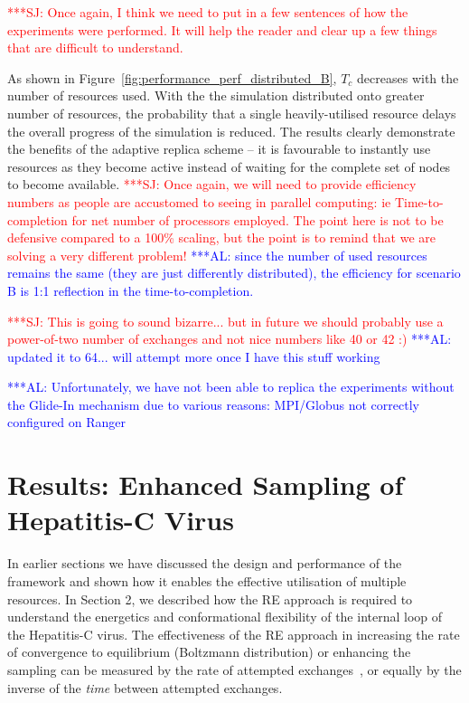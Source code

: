 \documentclass{rspublic}
\newcommand{\alnote}[1]{ {\textcolor{blue} { ***AL: #1 }}}
\newcommand{\jhanote}[1]{ {\textcolor{red} { ***SJ: #1 }}}
\newcommand{\alnote}[1]{}
\newcommand{\jhanote}[1]{}
\begin{document}
\jhanote{Once again, I think we need to put in a few sentences of how
  the experiments were performed. It will help the reader and clear up
  a few things that are difficult to understand.}

As shown in Figure~\ref{fig:performance_perf_distributed_B}, $T_{c}$
decreases with the number of resources used.  With the the simulation
distributed onto greater number of resources, the probability that a
single heavily-utilised resource delays the overall progress of the
simulation is reduced.
The results clearly demonstrate the benefits of the adaptive replica
scheme -- it is favourable to instantly use resources as they become
active instead of waiting for the complete set of nodes to become
available.  \jhanote{Once again, we will need to provide efficiency
  numbers as people are accustomed to seeing in parallel computing: ie
  Time-to-completion for net number of processors employed.  The point
  here is not to be defensive compared to a 100\% scaling, but the
  point is to remind that we are solving a very different problem!}
\alnote{since the number of used resources remains the same (they are
  just differently distributed), the efficiency for scenario B is 1:1
  reflection in the time-to-completion.}


\jhanote{This is going to sound bizarre... but in future we should
  probably use a power-of-two number of exchanges and not nice numbers
  like 40 or 42 :)}           
\alnote{updated it to 64... will attempt more once I have this stuff working}

                                      
\alnote{Unfortunately, we have not been able to replica the
  experiments without the Glide-In mechanism due to various reasons:
  MPI/Globus not correctly configured on Ranger}

\section{Results: Enhanced Sampling of Hepatitis-C Virus}
In earlier sections we have discussed the design and performance of
the framework and shown how it enables the effective utilisation of
multiple resources. In Section 2, we described how the RE approach is
required to understand the energetics and conformational flexibility
of the internal loop of the Hepatitis-C virus. The effectiveness of
the RE approach in increasing the rate of convergence to equilibrium
(Boltzmann distribution) or enhancing the sampling can be measured by
the rate of attempted exchanges~\citep{Lei:2007xe}, or equally by the
inverse of the {\it time} between attempted exchanges.
\end{document}
